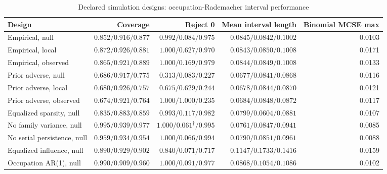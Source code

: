 \begin{table}[!htbp]
\centering
\caption{Declared simulation designs: occupation-Rademacher interval performance}\label{tab:appendix_simulation_designs_inference}
\scriptsize
\begin{tabular}{lrrrr}
\toprule
Design & Coverage & Reject 0 & Mean interval length & Binomial MCSE max \\
\midrule
Empirical, null & $0.852/0.916/0.877$ & $0.992/0.084/0.975$ & $0.0845/0.0842/0.1002$ & 0.0103 \\
Empirical, local & $0.872/0.926/0.881$ & $1.000/0.627/0.970$ & $0.0843/0.0850/0.1008$ & 0.0171 \\
Empirical, observed & $0.865/0.921/0.889$ & $1.000/0.169/0.979$ & $0.0844/0.0849/0.1008$ & 0.0133 \\
Prior adverse, null & $0.686/0.917/0.775$ & $0.313/0.083/0.227$ & $0.0677/0.0841/0.0868$ & 0.0116 \\
Prior adverse, local & $0.680/0.926/0.757$ & $0.675/0.629/0.244$ & $0.0678/0.0844/0.0870$ & 0.0121 \\
Prior adverse, observed & $0.674/0.921/0.764$ & $1.000/1.000/0.235$ & $0.0684/0.0848/0.0872$ & 0.0117 \\
Equalized sparsity, null & $0.835/0.883/0.859$ & $0.993/0.117/0.982$ & $0.0799/0.0604/0.0881$ & 0.0107 \\
No family variance, null & $0.995/0.939/0.977$ & $1.000/0.061^{\dagger}/0.995$ & $0.0761/0.0847/0.0941$ & 0.0085 \\
No serial persistence, null & $0.959/0.934/0.954$ & $1.000/0.066/0.994$ & $0.0790/0.0851/0.0961$ & 0.0088 \\
Equalized influence, null & $0.890/0.929/0.902$ & $0.840/0.071/0.717$ & $0.1147/0.1733/0.1416$ & 0.0159 \\
Occupation AR(1), null & $0.990/0.909/0.960$ & $1.000/0.091/0.977$ & $0.0868/0.1054/0.1086$ & 0.0102 \\
\bottomrule
\end{tabular}
\end{table}
